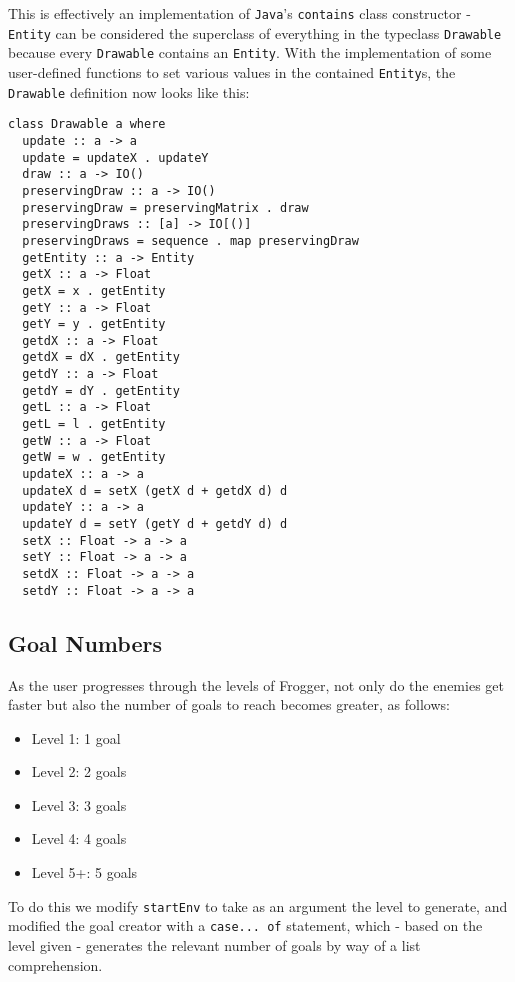 \documentclass[12pt, a4paper]{report}
\begin{document}
\par

This is effectively an implementation of \verb|Java|'s \verb|contains| class constructor - \verb|Entity| can be considered the superclass of everything in the typeclass \verb|Drawable| because every \verb|Drawable| contains an \verb|Entity|.
With the implementation of some user-defined functions to set various values in the contained \verb|Entity|s, the \verb|Drawable| definition now looks like this:

\begin{lstlisting}
class Drawable a where
  update :: a -> a
  update = updateX . updateY
  draw :: a -> IO()
  preservingDraw :: a -> IO()
  preservingDraw = preservingMatrix . draw
  preservingDraws :: [a] -> IO[()]
  preservingDraws = sequence . map preservingDraw
  getEntity :: a -> Entity
  getX :: a -> Float
  getX = x . getEntity
  getY :: a -> Float
  getY = y . getEntity
  getdX :: a -> Float
  getdX = dX . getEntity
  getdY :: a -> Float
  getdY = dY . getEntity
  getL :: a -> Float
  getL = l . getEntity
  getW :: a -> Float
  getW = w . getEntity
  updateX :: a -> a
  updateX d = setX (getX d + getdX d) d
  updateY :: a -> a
  updateY d = setY (getY d + getdY d) d
  setX :: Float -> a -> a
  setY :: Float -> a -> a
  setdX :: Float -> a -> a
  setdY :: Float -> a -> a
\end{lstlisting}

\subsection{Goal Numbers}

As the user progresses through the levels of Frogger, not only do the enemies get faster but also the number of goals to reach becomes greater, as follows:

\begin{itemize}
  \item Level 1: 1 goal
  \item Level 2: 2 goals
  \item Level 3: 3 goals
  \item Level 4: 4 goals
  \item Level 5+: 5 goals
\end{itemize}

To do this we modify \verb|startEnv| to take as an argument the level to generate, and modified the goal creator with a \verb|case... of| statement, which - based on the level given - generates the relevant number of goals by way of a list comprehension.
\end{document}
